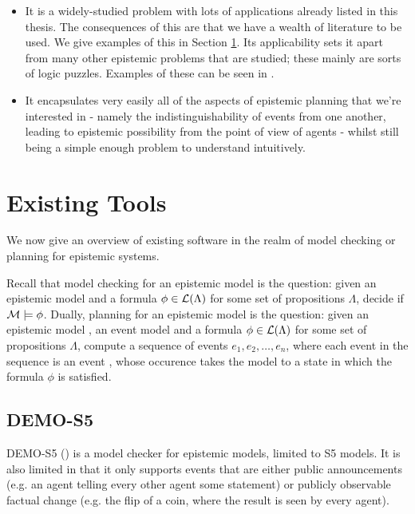 \documentclass[10pt, a4paper]{report}
\begin{document}
\begin{itemize}
\item It is a widely-studied problem with lots of applications already listed in
  this thesis. The consequences of this are that we have a wealth of literature
  to be used. We give examples of this in Section \ref{sec:ExistingTools}. Its
  applicability sets it apart from many other epistemic problems that are
  studied; these mainly are sorts of logic puzzles. Examples of these can be
  seen in \cite{DEMO-S5}.
\item It encapsulates very easily all of the aspects of epistemic planning that
  we're interested in - namely the indistinguishability of events from one
  another, leading to epistemic possibility from the point of view of agents -
  whilst still being a simple enough problem to understand intuitively.  
\end{itemize}

\section{Existing Tools}
\label{sec:ExistingTools}

We now give an overview of existing software in the realm of model checking or
planning for epistemic systems.

Recall that model checking for an epistemic model is the question: given an
epistemic model  and a formula $\phi \in \mathcal{L}(\Lambda)$ for some set of
propositions $\Lambda$, decide if $\mathcal{M} \models \phi$. Dually, planning for an
epistemic model is the question: given an epistemic model , an event
model  and a formula $\phi \in \mathcal{L}(\Lambda)$ for some set of
propositions $\Lambda$, compute a sequence of events $e_1, e_2, \ldots, e_n$,
where each event in the sequence is an event , whose occurence takes the
model  to a state in which the formula $\phi$ is satisfied. 

\subsection{DEMO-S5}

DEMO-S5 (\cite{DEMO-S5}) is a model checker for epistemic models, limited to
\textsf{S5} models. It is also limited in that it only supports events that are either
public announcements (e.g. an agent telling every other agent some statement) or
publicly observable factual change (e.g. the flip of a coin, where the result is
seen by every agent).
\end{document}
